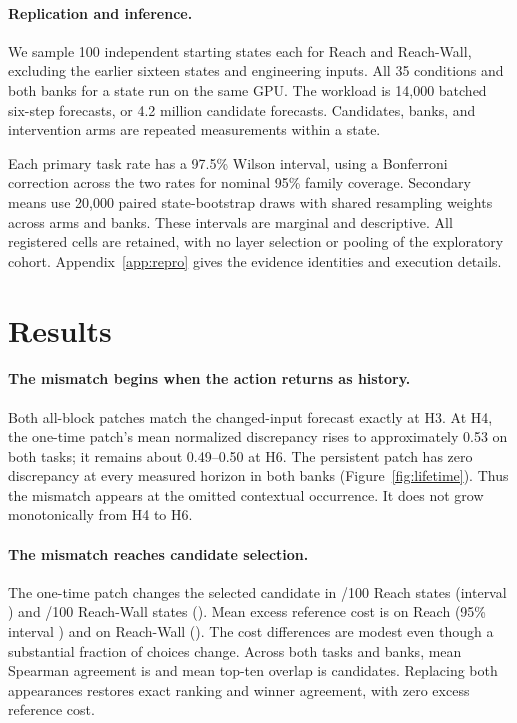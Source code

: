 \documentclass{article}
\begin{document}
\paragraph{Replication and inference.}
We sample 100 independent starting states each for Reach and Reach-Wall, excluding the earlier sixteen states and engineering inputs. All 35 conditions and both banks for a state run on the same GPU. The workload is 14,000 batched six-step forecasts, or 4.2 million candidate forecasts. Candidates, banks, and intervention arms are repeated measurements within a state.

Each primary task rate has a 97.5\% Wilson interval, using a Bonferroni correction across the two rates for nominal 95\% family coverage. Secondary means use 20,000 paired state-bootstrap draws with shared resampling weights across arms and banks. These intervals are marginal and descriptive. All registered cells are retained, with no layer selection or pooling of the exploratory cohort. Appendix~\ref{app:repro} gives the evidence identities and execution details.

\section{Results}
\paragraph{The mismatch begins when the action returns as history.}
Both all-block patches match the changed-input forecast exactly at H3. At H4, the one-time patch's mean normalized discrepancy rises to approximately 0.53 on both tasks; it remains about 0.49--0.50 at H6. The persistent patch has zero discrepancy at every measured horizon in both banks (Figure~\ref{fig:lifetime}). Thus the mismatch appears at the omitted contextual occurrence. It does not grow monotonically from H4 to H6.

\paragraph{The mismatch reaches candidate selection.}
The one-time patch changes the selected candidate in \LCFMReachChanged/100 Reach states (interval \LCFMReachCI) and \LCFMWallChanged/100 Reach-Wall states (\LCFMWallCI). Mean excess reference cost is \LCFMReachCost{} on Reach (95\% interval \LCFMReachCostCI) and \LCFMWallCost{} on Reach-Wall (\LCFMWallCostCI). The cost differences are modest even though a substantial fraction of choices change. Across both tasks and banks, mean Spearman agreement is \LCFMRankRange{} and mean top-ten overlap is \LCFMEliteRange{} candidates. Replacing both appearances restores exact ranking and winner agreement, with zero excess reference cost.
\end{document}
